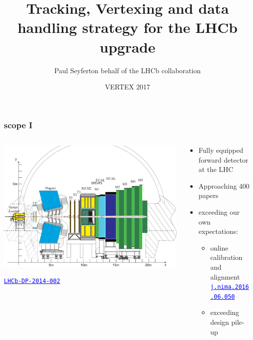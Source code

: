 \documentclass[table,xcolor=dvipsnames,professionalfonts]{beamer}
\author[Paul Seyfert]{Paul Seyfert\newline on behalf of the LHCb collaboration}
\institute[CERN]{CERN}
\date[15th September 2017]{VERTEX 2017}
\title[LHCb upgrade]{Tracking, Vertexing and data handling strategy for the LHCb upgrade}
\newcommand{\myhref}[2]{\href{#1}{\footnotesize{\textcolor{blue}{\texttt{#2}}}}}
\begin{document}
\maketitle

\begin{frame}
  \frametitle{scope I}

  \begin{columns}
    \begin{column}{.55\textwidth}
        \includegraphics[width=\textwidth,trim=0 0 0 50,clip]{LHCb-reoptimized-y.pdf}

        {\myhref{http://dx.doi.org/10.1142/S0217751X15300227}{LHCb-DP-2014-002}}
    \end{column}
    \begin{column}{.45\textwidth}
      \begin{itemize}
        \item Fully equipped forward detector at the LHC
        \item Approaching 400 papers
        \item exceeding our own expectations:
          \begin{itemize}
              \item online calibration and alignment
                \newline \myhref{http://dx.doi.org/10.1016/j.nima.2016.06.050}{j.nima.2016.06.050}
              \item exceeding design pile-up
          \end{itemize}
      \end{itemize}
    \end{column}
    \end{columns}
    \end{frame}
\end{document}
